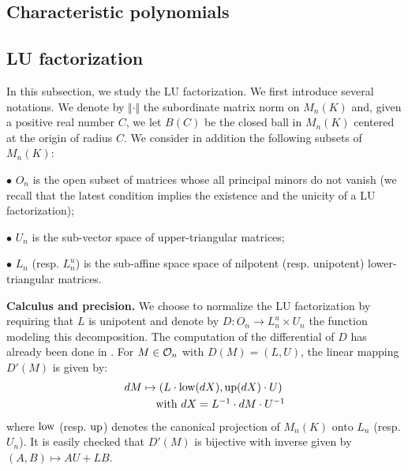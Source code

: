 \documentclass{sig-alternate}
\begin{document}
\subsection{Characteristic polynomials}


\subsection{LU factorization}

In this subsection, we study the LU factorization.
We first introduce several notations.
We denote by $\Vert \cdot \Vert$ the subordinate matrix norm on $M_n(K)$
and, given a positive real number $C$, we let $B(C)$ be the closed ball 
in $M_n(K)$ centered at the origin of radius $C$. We consider in addition
the following subsets of $M_n(K)$:

\noindent $\bullet$
$O_n$ is the open subset of matrices whose all principal 
minors do not vanish (we recall that the latest condition implies the
existence and the unicity of a LU factorization);

\noindent $\bullet$
$U_n$ is the sub-vector space of upper-triangular 
matrices;

\noindent $\bullet$
$L_n$ (resp. $L_n^u$) is the sub-affine space space of 
nilpotent (resp. unipotent) lower-triangular matrices.

\medskip

\noindent
{\bf Calculus and precision.}
We choose to normalize the LU factorization by requiring that $L$ is 
unipotent and denote by $D : O_n \to L_n^u \times U_n$ the function 
modeling this decomposition. The computation of the differential of $D$ 
has already been done in \cite[Appendix B]{caruso-roe-vaccon:14a}. For
$M \in \mathcal O_n$ with $D(M) = (L,U)$, the linear mapping $D'(M)$ is given 
by:
$$\begin{array}{l}
dM \mapsto (L \cdot \low(dX), \up(dX) \cdot U) \smallskip \\
\hspace{1cm}\text{with } dX = L^{-1} \cdot dM \cdot U^{-1}
\end{array}$$
where $\text{\rm low}$ (resp. $\text{\rm up}$) denotes the canonical projection of $M_n(K)$ 
onto $L_n$ (resp. $U_n$). 
It is easily checked that $D'(M)$ is bijective with inverse given by
$(A,B) \mapsto AU+LB$.
\end{document}
